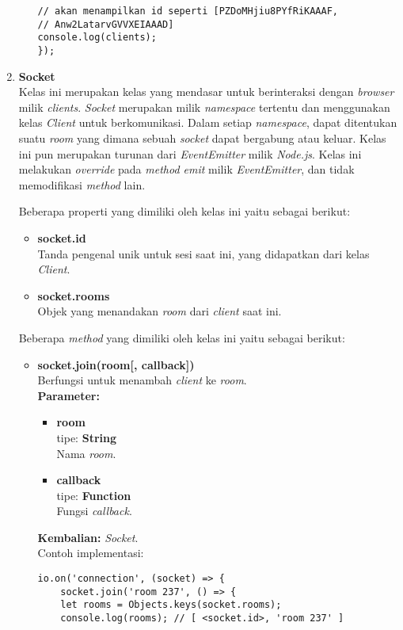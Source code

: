 \begin{enumerate}
\begin{itemize}
\begin{lstlisting}
// akan menampilkan id seperti [PZDoMHjiu8PYfRiKAAAF, 
// Anw2LatarvGVVXEIAAAD]
console.log(clients); 
});
\end{lstlisting}
	\end{itemize}
	
	\item \textbf{Socket} \\
	Kelas ini merupakan kelas yang mendasar untuk berinteraksi dengan \textit{browser} milik \textit{clients}. \textit{Socket} merupakan milik \textit{namespace} tertentu dan menggunakan kelas \textit{Client} untuk berkomunikasi. Dalam setiap \textit{namespace}, dapat ditentukan suatu \textit{room} yang dimana sebuah \textit{socket} dapat bergabung atau keluar. Kelas ini pun merupakan turunan dari \textit{EventEmitter} milik \textit{Node.js}. Kelas ini melakukan \textit{override} pada \textit{method emit} milik \textit{EventEmitter}, dan tidak memodifikasi \textit{method} lain.
	
	Beberapa properti yang dimiliki oleh kelas ini yaitu sebagai berikut:
	\begin{itemize}
		\item \textbf{socket.id} \\ Tanda pengenal unik untuk sesi saat ini, yang didapatkan dari kelas \textit{Client}.
		\item \textbf{socket.rooms} \\ Objek yang menandakan \textit{room} dari \textit{client} saat ini.
	\end{itemize}

	Beberapa \textit{method} yang dimiliki oleh kelas ini yaitu sebagai berikut:
	\begin{itemize}
		\item \textbf{socket.join(room[, callback])} \\
		Berfungsi untuk menambah \textit{client} ke \textit{room}. \\
		\textbf{Parameter:}
		\begin{itemize}
			\item \textbf{room} \\tipe: \textbf{String} \\ Nama \textit{room}.
			\item \textbf{callback} \\tipe: \textbf{Function} \\ Fungsi \textit{callback}.
		\end{itemize}
		\textbf{Kembalian:} \textit{Socket}. \\
		Contoh implementasi:
	\begin{lstlisting}
io.on('connection', (socket) => {
	socket.join('room 237', () => {
	let rooms = Objects.keys(socket.rooms);
	console.log(rooms); // [ <socket.id>, 'room 237' ]
		

\end{lstlisting}
\end{itemize}
\end{enumerate}
